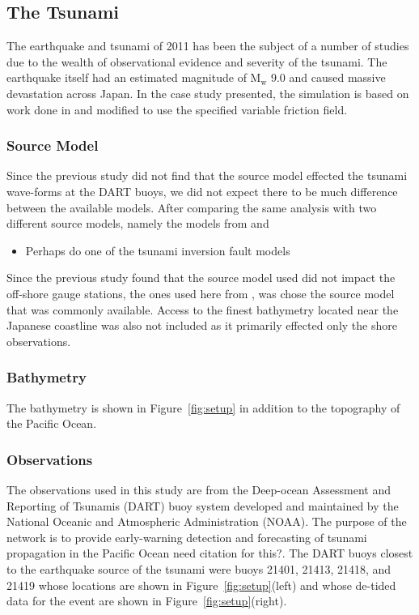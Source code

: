 \subsection{The \tohoku Tsunami} \label{ssub:tohoku}

The \tohoku earthquake and tsunami of 2011 has been the subject of a number of studies due to the wealth of observational evidence and severity of the tsunami.  The earthquake itself had an estimated magnitude of $\text{M}_\text{w}$ 9.0 and caused massive devastation across Japan.  In the case study presented, the simulation is based on work done in \cite{MacInnes:2013cr} and modified to use the specified variable friction field.


\subsubsection{Source Model}

Since the previous study \cite{MacInnes:2013cr} did not find that the source model effected the tsunami wave-forms at the DART buoys, we did not expect there to be much difference between the available models.  After comparing the same analysis with two different source models, namely the models from \cite{Ammon:2011dm} and

\begin{itemize}
    \item Perhaps do one of the tsunami inversion fault models
\end{itemize}

Since the previous study found that the source model used did not impact the off-shore gauge stations, the ones used here from \cite{Ammon:2011dm}, was chose the source model that was commonly available.  Access to the finest bathymetry located near the Japanese coastline was also not included as it primarily effected only the shore observations.

\subsubsection{Bathymetry}
The bathymetry is shown in Figure~\ref{fig:setup} in addition to the topography
of the Pacific Ocean.
\subsubsection{Observations}

The observations used in this study are from the Deep-ocean Assessment and Reporting of Tsunamis (DART) buoy system developed and maintained by the National Oceanic and Atmospheric Administration (NOAA).  The purpose of the network is to provide early-warning detection and forecasting of tsunami propagation in the Pacific Ocean \alert{need citation for this?}.  The DART buoys closest to the earthquake source of the \tohoku tsunami were buoys 21401, 21413, 21418, and 21419 whose locations are shown in Figure~\ref{fig:setup}(left) and whose de-tided data for the event are shown in Figure~\ref{fig:setup}(right).
